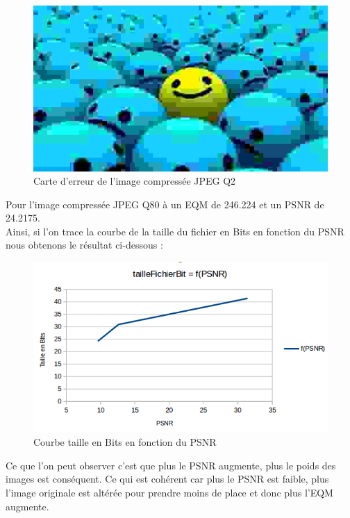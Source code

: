 \documentclass[12pt]{report}
\begin{document}
\begin{figure}[H]
\begin{center}
\includegraphics[scale=0.5]{../smileyDegQ2.jpg} 
\caption{Carte d'erreur de l'image compressée JPEG Q2 }
\end{center}
\end{figure}

Pour l'image compressée JPEG Q80 à un EQM de 246.224 et un PSNR de 24.2175.\\

Ainsi, si l'on trace la courbe de la taille du fichier en Bits en fonction du PSNR nous obtenons le résultat ci-dessous :

\begin{figure}[H]
\begin{center}
\includegraphics[scale=0.8]{../ImageRes/f(PSNR).png} 
\caption{Courbe taille en Bits en fonction du PSNR }
\end{center}
\end{figure}

Ce que l'on peut observer c'est que plus le PSNR augmente, plus le poids des images est conséquent. Ce qui est cohérent car plus le PSNR est faible, plus l'image originale est altérée pour prendre moins de place et donc plus l'EQM augmente.
\end{document}
